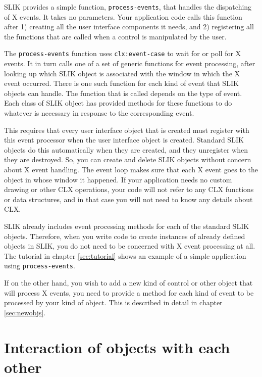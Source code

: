 \documentclass[twoside,openright,11pt]{report}
\newcommand{\tp}[1]{\texttt{#1}}
\begin{document}
SLIK provides a simple function, \tp{process-events}, that handles the
dispatching of X events.  It takes no parameters.  Your application
code calls this function after 1) creating all the user interface
components it needs, and 2) registering all the functions that are
called when a control is manipulated by the user.

The \tp{process-events} function uses \tp{clx:event-case} to wait for
or poll for X events.  It in turn calls one of a set of generic
functions for event processing, after looking up which SLIK object is
associated with the window in which the X event occurred.  There is
one such function for each kind of event that SLIK objects can handle.
The function that is called depends on the type of event.  Each class
of SLIK object has provided methods for these functions to do whatever
is necessary in response to the corresponding event.

This requires that every user interface object that is created must
register with this event processor when the user interface object is
created.  Standard SLIK objects do this automatically when they are
created, and they unregister when they are destroyed.  So, you can
create and delete SLIK objects without concern about X event handling.
The event loop makes sure that each X event goes to the object in
whose window it happened.  If your application needs no custom drawing
or other CLX operations, your code will not refer to any CLX functions
or data structures, and in that case you will not need to know any
details about CLX.

SLIK already includes event processing methods for each of the
standard SLIK objects.  Therefore, when you write code to create
instances of already defined objects in SLIK, you do not need to be
concerned with X event processing at all.  The tutorial in chapter
\ref{sec:tutorial} shows an example of a simple application using
\tp{process-events}.

If on the other hand, you wish to add a new kind of control or other
object that will process X events, you need to provide a method for
each kind of event to be processed by your kind of object.  This is
described in detail in chapter \ref{sec:newobjs}.

\section{Interaction of objects with each other} \label{sec:abt}
\end{document}
